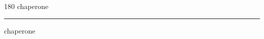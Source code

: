 
\begin{frame}
\begin{center}
\begin{turn}{180}
{\fontsize{2.5cm}{1em}\selectfont chaperone}
\end{turn}
\vspace{1em}\par  
\hrule
\vspace{1em}\par  
{\fontsize{2.5cm}{1em}\selectfont chaperone}
\end{center}
\end{frame}
